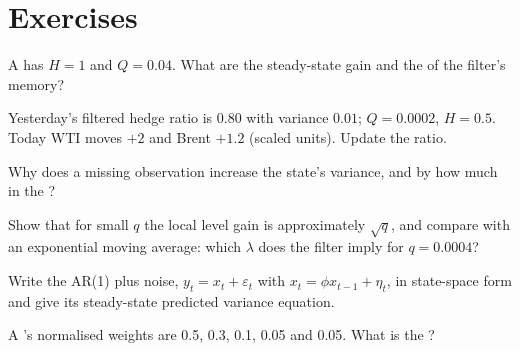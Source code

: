 \section{Exercises}

\begin{exercise}[$\star$]\label{exo:qm:state-space-models-and-the-kalman-filter:1}
A  has $H = 1$ and $Q = 0.04$. What are the steady-state gain and the  of the filter's memory?
\end{exercise}

\begin{exercise}[$\star$]\label{exo:qm:state-space-models-and-the-kalman-filter:2}
Yesterday's filtered hedge ratio is $0.80$ with variance $0.01$; $Q = 0.0002$, $H = 0.5$. Today WTI moves $+2$ and Brent $+1.2$ (scaled units). Update the ratio.
\end{exercise}

\begin{exercise}[$\star$]\label{exo:qm:state-space-models-and-the-kalman-filter:3}
Why does a missing observation increase the state's variance, and by how much in the ?
\end{exercise}

\begin{exercise}[$\star\star$]\label{exo:qm:state-space-models-and-the-kalman-filter:4}
Show that for small $q$ the local level gain is approximately $\sqrt q$, and compare with an exponential moving average: which $\lambda$ does the filter
imply for $q = 0.0004$?
\end{exercise}

\begin{exercise}[$\star\star$]\label{exo:qm:state-space-models-and-the-kalman-filter:5}
Write the AR(1) plus noise, $y_t = x_t + \varepsilon_t$ with $x_t = \phi x_{t-1} + \eta_t$, in state-space form and give its steady-state predicted variance
equation.
\end{exercise}

\begin{exercise}[$\star\star$]\label{exo:qm:state-space-models-and-the-kalman-filter:6}
A 's normalised weights are 0.5, 0.3, 0.1, 0.05 and 0.05. What is the ?
\end{exercise}

